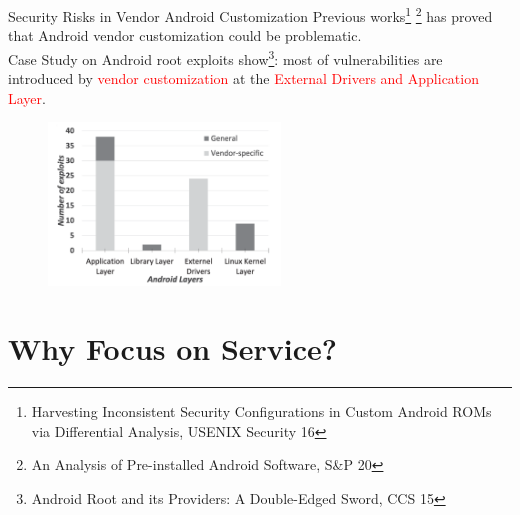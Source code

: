 \documentclass[notheorems, aspectratio=54]{beamer}
\begin{document}
\begin{frame}

	\begin{block}{Security Risks in Vendor Android Customization}
		Previous works\footnote{\tiny{Harvesting Inconsistent Security Configurations in Custom Android ROMs via Differential Analysis, USENIX Security 16}} \footnote{\tiny{An Analysis of Pre-installed Android Software, S\&P 20}} has proved that Android vendor customization could be problematic. 
		\\[2ex]
		Case Study on Android root exploits show\footnote{\tiny{Android Root and its Providers: A Double-Edged Sword, CCS 15}}: most of vulnerabilities are introduced by \textcolor{red}{vendor customization} at the \textcolor{red}{External Drivers and Application Layer}.
		\begin{figure}
			\centering
			\includegraphics[width=0.55\textwidth]{res/exploits-category-before-2015.png}
			\vspace*{-0.3cm}
		\end{figure}
	\end{block}

\end{frame}


\section{Why Focus on Service?}
\end{document}
